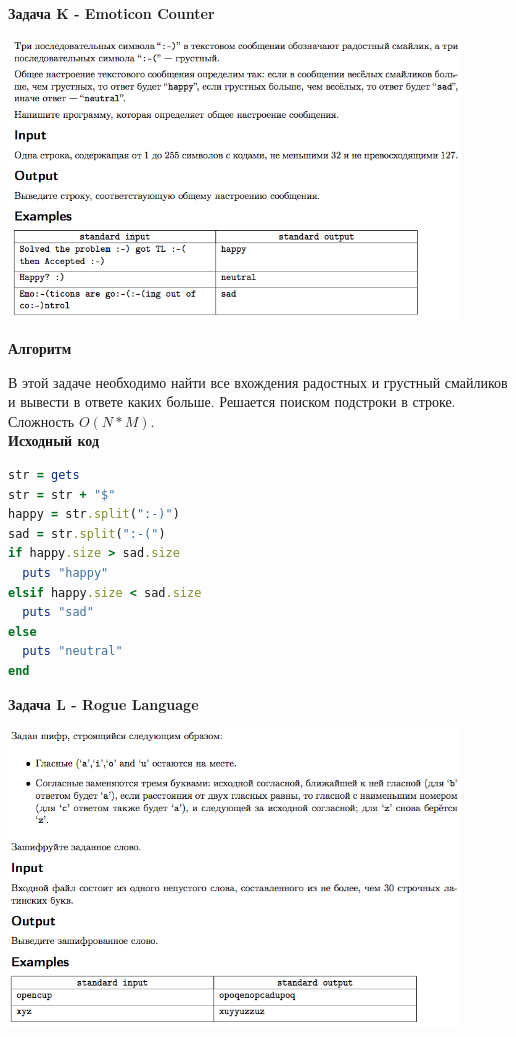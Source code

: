 \documentclass[a4paper,12pt]{article}
\begin{document}
\newpage
\textbf{{\large Задача K - Emoticon Counter}} \\

\begin{center}
\includegraphics[width=0.9\textwidth]{OC_Japan/K.png}\\ [1cm]
\end{center}

\textbf{{\large Алгоритм}}

В этой задаче необходимо найти все вхождения радостных и грустный смайликов и вывести в ответе каких больше. Решается поиском подстроки в строке. Сложность $O(N * M)$. \\

\textbf{{\large Исходный код}} \\
\begin{lstlisting}[language=Ruby]
str = gets
str = str + "$"
happy = str.split(":-)")
sad = str.split(":-(")
if happy.size > sad.size
  puts "happy"
elsif happy.size < sad.size
  puts "sad"
else
  puts "neutral"
end
\end{lstlisting}


\newpage
\textbf{{\large Задача L - Rogue Language}} \\

\begin{center}
\includegraphics[width=0.9\textwidth]{OC_Japan/L.png}\\ [1cm]
\end{center}
\end{document}
